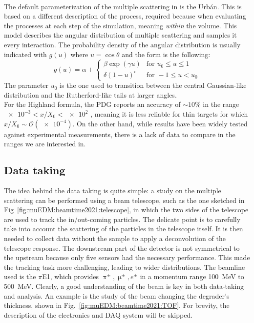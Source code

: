 \begin{refsection}
        \paragraph{\gf}
        The default parameterization of the multiple scattering in \gf is the Urb\'{a}n. This is based on a different description of the process, required because when evaluating the processes at each step of the simulation, meaning \textit{within} the volume.
        This model describes the angular distribution of multiple scattering and samples it every interaction.
        The probability density of the angular distribution is usually indicated with $g(u)$ where $u = \cos \theta$ and the form is the following:
        \begin{equation}
            g(u) = \alpha +
            \begin{cases}
                \beta \exp(\gamma u) &\text{for } u_0 \le u \le 1 \\
                \delta (1-u)^\epsilon &\text{for } -1 \le u < u_0
            \end{cases}
        \end{equation}
        The parameter $u_0$ is the one used to transition between the central Gaussian-like distribution and the Rutherford-like tails at larger angles.\\

        \noindent
        For the Highland formula, the PDG reports an accuracy of $\sim 10\%$ in the range $\num{e-3}<x/X_0<\num{e2}$ \cite{PDG}, meaning it is less reliable for thin targets for which $x/X_0 \sim \mathcal{O}(\num{e-4})$.
        On the other hand, while \gf results have been widely tested against experimental measurements, there is a lack of data to compare in the ranges we are interested in.

    \subsection{Data taking}
        The idea behind the data taking is quite simple: a study on the multiple scattering can be performed using a beam telescope, such as the one sketched in Fig~\ref{fig:muEDM:beamtime2021:telescope}, in which the two sides of the telescope are used to track the in/out-coming particles. 
        The delicate point is to carefully take into account the scattering of the particles in the telescope itself. 
        It is then needed to collect data without the sample to apply a deconvolution of the telescope response.
        The downstream part of the detector is not symmetrical to the upstream because only five sensors had the necessary performance. This made the tracking task more challenging, leading to wider distributions.
        The beamline used is the $\pi$E1, which provides $\uppi^\pm,\upmu^\pm,e^\pm$ in a momentum range \SI{100}{MeV} to \SI{500}{MeV}.
        Clearly, a good understanding of the beam is key in both data-taking and analysis. 
        An example is the study of the beam changing the degrader's thickness, shown in Fig.~\ref{fig:muEDM:beamtime2021:TOF}.
        For brevity, the description of the electronics and DAQ system will be skipped. 


\end{refsection}
